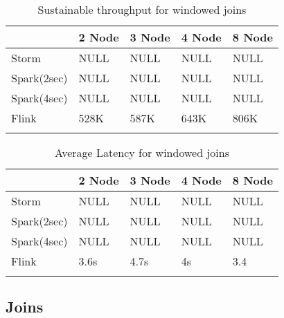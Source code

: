     \begin{table}
        \begin{tabular}{lllll}\toprule
            &\textbf{2 Node} & \textbf{3 Node} & \textbf{4 Node} & \textbf{8 Node}\\\midrule
            Storm & NULL & NULL & NULL & NULL\\
            Spark(2sec) & NULL & NULL & NULL & NULL\\
            Spark(4sec) & NULL & NULL & NULL & NULL\\
            Flink & 528K & 587K & 643K & 806K\\
            \\\bottomrule
        \end{tabular}
        \caption{Sustainable throughput for windowed joins}\label{Tab1}
    \end{table} 


    \begin{table}
        \begin{tabular}{lllll}\toprule
            &\textbf{2 Node} & \textbf{3 Node} & \textbf{4 Node} & \textbf{8 Node}\\\midrule
            Storm & NULL & NULL & NULL & NULL\\
            Spark(2sec) & NULL & NULL & NULL & NULL\\
            Spark(4sec) & NULL & NULL & NULL & NULL\\
            Flink & 3.6s & 4.7s & 4s & 3.4\\
            \\\bottomrule
        \end{tabular}
        \caption{Average Latency for windowed joins}\label{Tab1}
    \end{table} 


\subsection{Joins}





